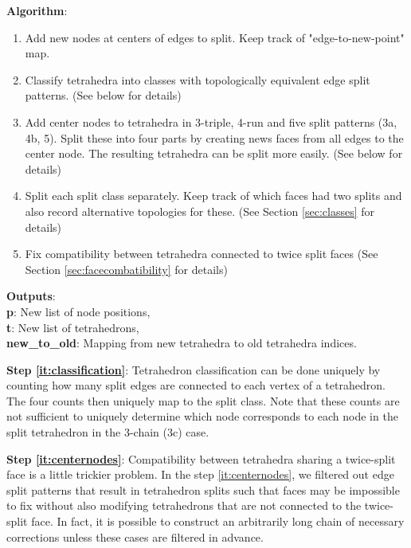 \documentclass{article}
\begin{document}
	\noindent\textbf{Algorithm}:
	\begin{enumerate}[label=\textbf{\arabic*:}, ref=\arabic*, itemsep=0em, parsep=0em]
		\item Add new nodes at centers of edges to split. Keep track of "edge-to-new-point" map.
		\item Classify tetrahedra into classes with topologically equivalent edge split patterns. (See below for details)
		\label{it:classification}
		\item Add center nodes to tetrahedra in 3-triple, 4-run and five split patterns (3a, 4b, 5). Split these into four parts by creating news faces from all edges to the center node. The resulting tetrahedra can be split more easily. (See below for details)
		\label{it:centernodes}
		\item Split each split class separately. Keep track of which faces had two splits and also record alternative topologies for these. (See Section \ref{sec:classes} for details)
		\label{it:splits}
		\item Fix compatibility between tetrahedra connected to twice split faces (See Section \ref{sec:facecombatibility} for details)
		\label{it:facecompatibility}
	\end{enumerate}

	\noindent\textbf{Outputs}: \\
	\indent\textbf{p}: New list of node positions, \\
	\indent\textbf{t}: New list of tetrahedrons, \\
	\indent\textbf{new\_to\_old}: Mapping from new tetrahedra to old tetrahedra indices.
	\vspace{1cm}

	\noindent\textbf{Step \ref{it:classification}}: Tetrahedron classification can be done uniquely by counting how many split edges are connected to each vertex of a tetrahedron. The four counts then uniquely map to the split class. Note that these counts are not sufficient to uniquely determine which node corresponds to each node in the split tetrahedron in the 3-chain (3c) case.


	\noindent\textbf{Step \ref{it:centernodes}}: Compatibility between tetrahedra sharing a twice-split face is a little trickier problem. In the step \ref{it:centernodes}, we filtered out edge split patterns that result in tetrahedron splits such that faces may be impossible to fix without also modifying tetrahedrons that are not connected to the twice-split face. In fact, it is possible to construct an arbitrarily long chain of necessary corrections unless these cases are filtered in advance.
\end{document}
